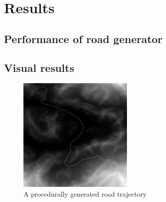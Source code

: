 \chapter{Results}

\section{Performance of road generator}

\section{Visual results}

\begin{figure}[ht]
\centering
\includegraphics[width=0.5\textwidth]{figure/generated_road_trajectory}
\caption{A procedurally generated road trajectory}
\label{fig:road_trajectory}
\end{figure}

